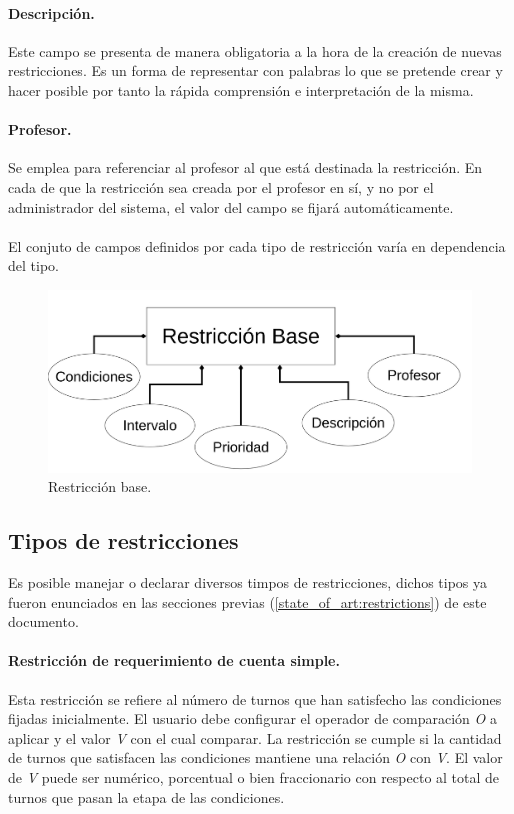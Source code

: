 \paragraph{Descripción.}
Este campo se presenta de manera obligatoria a la hora de la creación de nuevas restricciones. Es un forma de representar con palabras lo que se pretende crear y hacer posible por tanto la rápida comprensión e interpretación de la misma. 

\paragraph{Profesor.}
Se emplea para referenciar al profesor al que está destinada la restricción. En cada de que la restricción sea creada por el profesor en sí, y no por el administrador del sistema, el valor del campo se fijará automáticamente. \\\\

El conjuto de campos definidos por cada tipo de restricción varía en dependencia del tipo.

\begin{figure}[h]
	\centering
	\includegraphics[width=0.75\linewidth]{images/Chapter 2/base_restrictions}
	\caption{Restricción base.}
	\label{fig:base_restrictions}
\end{figure}

\subsection{Tipos de restricciones}

Es posible manejar o declarar diversos timpos de restricciones, dichos tipos ya fueron enunciados en las secciones previas (\ref{state_of_art:restrictions}) de este documento.

\paragraph{Restricción de requerimiento de cuenta simple.}  Esta restricción se refiere al número de turnos que han satisfecho las 
 condiciones fijadas inicialmente. El usuario debe configurar el operador de comparación \textit{O} a aplicar y el valor \textit{V} con el cual comparar. La restricción se cumple si la cantidad de turnos que satisfacen las condiciones mantiene una relación \textit{O} con \textit{V}. El valor de \textit{V} puede ser numérico, porcentual o bien fraccionario  con respecto al total de turnos que pasan la etapa de las condiciones.

